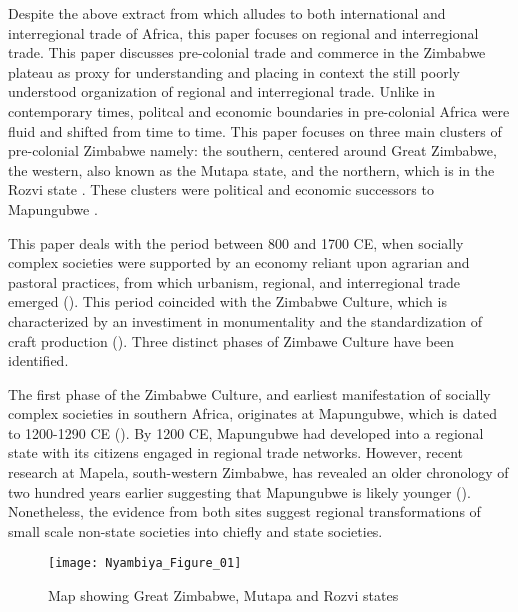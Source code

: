 Despite the above extract from \parencite{pikirayi2017} which alludes to both international and interregional trade of Africa, this paper focuses on regional and interregional trade. This paper discusses pre-colonial trade and commerce in the Zimbabwe plateau as proxy for understanding and placing in context the still poorly understood  organization of regional and interregional trade. Unlike in contemporary times, politcal and economic boundaries in pre-colonial Africa were fluid and shifted from time to time. This paper focuses on three main clusters of pre-colonial Zimbabwe namely: the southern, centered around Great Zimbabwe, the western, also known as the Mutapa state, and the northern, which is in the Rozvi state .
These clusters were political and economic successors to Mapungubwe
\parencites{huffman2000}{huffman2009}{huffman2015}{pikirayi1993}{pikirayi2001}{pwiti2005}.

This paper deals with the period between 800 and 1700 CE, when socially complex societies were supported by an economy reliant upon agrarian and pastoral practices, from which urbanism,  regional, and interregional trade emerged (\cites{huffman1986}{pwiti2005}{mitchell2002}). This period coincided with the Zimbabwe Culture, which is characterized by an investiment in monumentality and the standardization of craft production (\cites{pikirayi2001}{pikirayi2013archit}{huffman1996}{kim2008}). Three distinct phases of Zimbawe Culture have been identified.

The first phase of the Zimbabwe Culture, and earliest manifestation of socially complex societies in southern Africa, originates at Mapungubwe, which is dated to 1200-1290 CE (\cites{pwiti2005}{pikirayi2006}{kim2008}{chirikure2014}{huffman2015}). By 1200 CE, Mapungubwe had developed into a  regional state with its citizens engaged in regional trade networks.  However, recent research at Mapela, south-western Zimbabwe, has revealed an older chronology of two hundred years earlier suggesting that Mapungubwe is likely younger (\cites{chirikure2013socio}{chirikure2014}).
 Nonetheless, the evidence from both sites suggest  regional transformations of small scale non-state societies into chiefly and state societies.

\begin{figure}[!tb]
	\texttt{[image: Nyambiya\_Figure\_01]}
	\caption{Map showing Great Zimbabwe, Mutapa and Rozvi states
		{\normalfont\scriptsize %
	}
}
	\label{fig:Nyambiya_Figure_01}
\end{figure}

